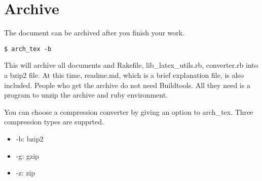 \section{Archive}

The document can be archived after you finish your work.

\begin{verbatim}
$ arch_tex -b
\end{verbatim}

This will archive all documents and Rakefile, lib\_latex\_utils.rb,
converter.rb into a bzip2 file. At this time, readme.md, which is a
brief explanation file, is also included. People who get the archive do
not need Buildtools. All they need is a program to unzip the archive and
ruby environment.

You can choose a compression converter by giving an option to arch\_tex.
Three compression types are supprted.

\begin{itemize}
\item
  -b: bzip2
\item
  -g: gzip
\item
  -z: zip
\end{itemize}
